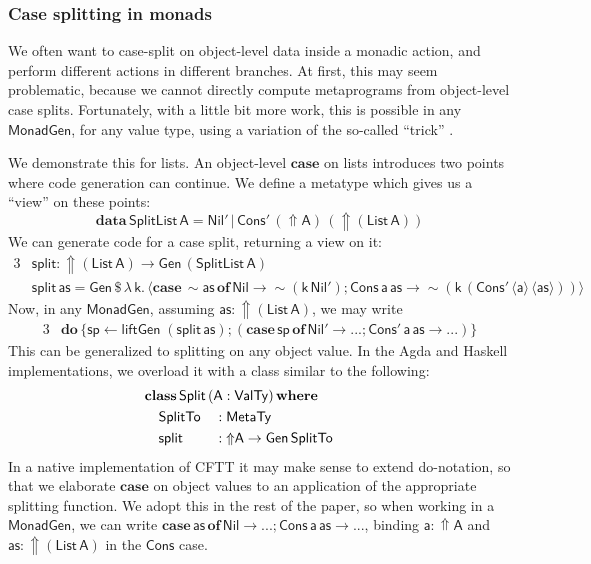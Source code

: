 \documentclass[acmsmall,screen]{acmart}
\newcommand{\mit}[1]{{\mathsf{#1}}}
\newcommand{\msf}[1]{{\mathsf{#1}}}
\newcommand{\mbf}[1]{{\mathbf{#1}}}
\newcommand{\bs}[1]{\boldsymbol{#1}}
\newcommand{\mdo}{\mbf{do}\,}
\newcommand{\ind}{\hspace{1em}}
\newcommand{\lam}{\lambda\,}
\newcommand{\data}{\mbf{data}\,}
\newcommand{\where}{\mbf{where}}
\newcommand{\of}{\mbf{of}\,}
\newcommand{\vas}{\mathsf{as}}
\newcommand{\vk}{\mathsf{k}}
\newcommand{\vA}{\mathsf{A}}
\newcommand{\va}{\mathsf{a}}
\newcommand{\List}{\msf{List}}
\newcommand{\Nil}{\msf{Nil}}
\newcommand{\Cons}{\msf{Cons}}
\newcommand{\fro}{\leftarrow}
\newcommand{\case}{\mbf{case\,}}
\newcommand{\Lift}{{\Uparrow}}
\newcommand{\Up}{{\Uparrow}}
\newcommand{\spl}{{\bs{\sim}}}
\newcommand{\ql}{{\bs{\langle}}}
\newcommand{\qr}{{\bs{\rangle}}}
\newcommand{\MTy}{\msf{MetaTy}}
\newcommand{\VTy}{\msf{ValTy}}
\theoremstyle{remark}
\newcommand{\tyclass}{\mbf{class}}
\newcommand{\Gen}{\msf{Gen}}
\newcommand{\qt}[1]{\ql#1\qr}
\newcommand{\liftGen}{\mit{liftGen}}
\newcommand{\MonadGen}{\msf{MonadGen}}
\newcommand{\dlr}{\,\$\,}
\begin{document}
\subsubsection{Case splitting in monads}
We often want to case-split on object-level data inside a monadic action, and
perform different actions in different branches. At first, this may seem
problematic, because we cannot directly compute metaprograms from object-level
case splits. Fortunately, with a little bit more work, this is possible in any
$\MonadGen$, for any value type, using a variation of the so-called ``trick''
\cite{eta-expansion-trick}.

We demonstrate this for lists. An object-level $\mbf{case}$ on lists introduces
two points where code generation can continue. We define a metatype which gives
us a ``view'' on these points:
\[ \data \msf{SplitList}\,\vA = \Nil'\,|\,\Cons'\,(\Up \vA)\,(\Up (\List\,\vA)) \]
We can generate code for a case split, returning a view on it:
\begin{alignat*}{3}
  &\mit{split} : \Up (\List\,\vA) \to \Gen\,(\msf{SplitList}\,\vA)\\
  &\mit{split}\,\vas = \Gen \dlr \lam \vk.\,\qt{\case \spl \vas\,\of \Nil \to \spl(\vk\,\Nil'); \Cons\,\va\,\vas \to \spl(\vk\,(\Cons'\,\qt{\va}\,\qt{\vas}))}
\end{alignat*}
Now, in any $\MonadGen$, assuming $\vas : \Up(\List\,\vA)$, we may write
\begin{alignat*}{3}
  &\mdo \{\mit{sp} \fro \liftGen\;(\!\mit{split}\,\vas);(\case \mit{sp}\,\of \Nil' \to ...;\Cons'\,\va\,\vas \to ...)\}
\end{alignat*}
This can be generalized to splitting on any object value. In the Agda and
Haskell implementations, we overload it with a class similar to the following:
\begin{alignat*}{3}
  & \hspace{-2em}\mathrlap{\tyclass\,\mit{Split}\,(\vA : \VTy)\,\where}\\
  & \hspace{-2em}\ind \mit{SplitTo} &&: \MTy \\
  & \hspace{-2em}\ind \mit{split}   &&: \Lift \vA \to \Gen\,\mit{SplitTo}
\end{alignat*}
In a native implementation of CFTT it may make sense to extend do-notation, so
that we elaborate $\mbf{case}$ on object values to an application of the
appropriate splitting function. We adopt this in the rest of the paper, so
when working in a $\MonadGen$, we can write $\case \vas\,\of \Nil \to ...;
\Cons\,\va\,\vas \to ...$, binding $\va : \Up \vA$ and $\vas : \Up(\List\,\vA)$
in the $\Cons$ case.
\end{document}
